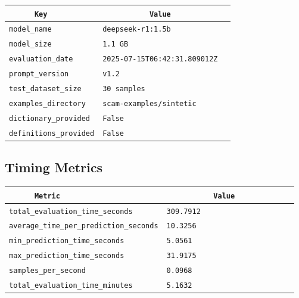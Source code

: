 \documentclass{article}
\begin{document}
\begin{center}
\begin{tabular}{l | l} \hline
    \verb|      Key      | & \verb|           Value           | \\ \hline
    \hline
    \verb|model_name    | & \verb|deepseek-r1:1.5b             | \\ \hline
    \verb|model_size    | & \verb|1.1 GB                       | \\ \hline
    \verb|evaluation_date| & \verb|2025-07-15T06:42:31.809012Z  | \\ \hline
    \verb|prompt_version| & \verb|v1.2                         | \\ \hline
    \verb|test_dataset_size| & \verb|30 samples                   | \\ \hline
    \verb|examples_directory| & \verb|scam-examples/sintetic       | \\ \hline
    \verb|dictionary_provided| & \verb|False                        | \\ \hline
    \verb|definitions_provided| & \verb|False                        | \\ \hline
\end{tabular}
\end{center}

\subsection{Timing Metrics}

\begin{center}
\begin{tabular}{l | l} \hline
    \verb|      Metric     | & \verb|           Value           | \\ \hline
    \hline
    \verb|total_evaluation_time_seconds| & \verb|309.7912                     | \\ \hline
    \verb|average_time_per_prediction_seconds| & \verb|10.3256                      | \\ \hline
    \verb|min_prediction_time_seconds| & \verb|5.0561                       | \\ \hline
    \verb|max_prediction_time_seconds| & \verb|31.9175                      | \\ \hline
    \verb|samples_per_second| & \verb|0.0968                       | \\ \hline
    \verb|total_evaluation_time_minutes| & \verb|5.1632                       | \\ \hline
\end{tabular}
\end{center}
\end{document}
